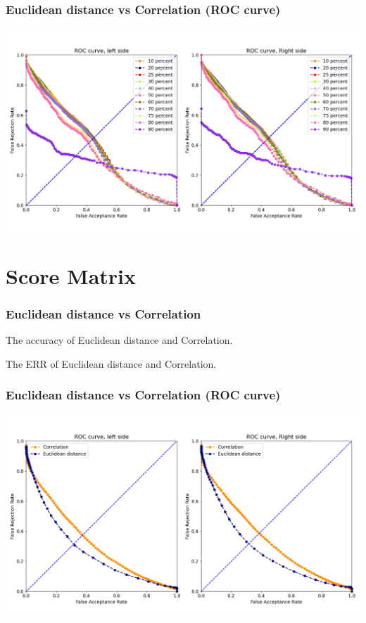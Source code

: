 \documentclass{beamer}
\begin{document}
\begin{frame}
\centering
\frametitle{Euclidean distance vs Correlation (ROC curve)}
\includegraphics[scale=0.3]{Manuscripts/src/figures/testsize.png}
\end{frame}



\section{Score Matrix}

\begin{frame}
\frametitle{Euclidean distance vs Correlation}
\tiny
\begin{table}
\centering
\captionsetup{labelformat=empty}
\caption{\small The accuracy of Euclidean distance and Correlation.}
\label{tab:parameters condition}

\end{table}
\begin{table}
\centering
\captionsetup{labelformat=empty}
\caption{\small The  ERR of Euclidean distance and Correlation.}
\label{tab:parameters condition}

\end{table}
\end{frame}


\begin{frame}
\centering
\frametitle{Euclidean distance vs Correlation (ROC curve)}
\includegraphics[scale=0.3]{Manuscripts/src/figures/Correlation.png}
\end{frame}
\end{document}
